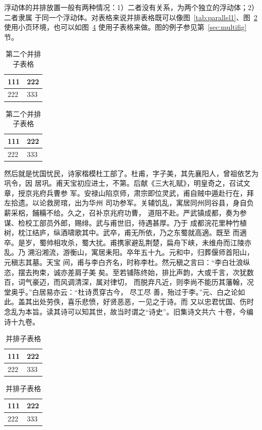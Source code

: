 浮动体的并排放置一般有两种情况：1）二者没有关系，为两个独立的浮动体；2）二者隶属
于同一个浮动体。对表格来说并排表格既可以像图~\ref{tab:parallel1}、图~\ref{tab:parallel2} 
使用小页环境，也可以如图~\ref{tab:subtable} 使用子表格来做。图的例子参见第~\ref{sec:multifig} 节。

\begin{table}[htbp]
\noindent\begin{minipage}{0.5\textwidth}
\centering
\caption{第一个并排子表格}
\label{tab:parallel1}
\begin{tabular}{p{2cm}p{2cm}}
\toprule[1.5pt]
111 & 222 \\\midrule[1pt]
222 & 333 \\\bottomrule[1.5pt]
\end{tabular}
\end{minipage}%
\begin{minipage}{0.5\textwidth}
\centering
\caption{第二个并排子表格}
\label{tab:parallel2}
\begin{tabular}{p{2cm}p{2cm}}
\toprule[1.5pt]
111 & 222 \\\midrule[1pt]
222 & 333 \\\bottomrule[1.5pt]
\end{tabular}
\end{minipage}
\end{table}

然后就是忧国忧民，诗家楷模杜工部了。杜甫，字子美，其先襄阳人，曾祖依艺为巩令，因
居巩。甫天宝初应进士，不第。后献《三大礼赋》，明皇奇之，召试文章，授京兆府兵曹参
军。安禄山陷京师，肃宗即位灵武，甫自贼中遁赴行在，拜左拾遗。以论救房琯，出为华州
司功参军。关辅饥乱，寓居同州同谷县，身自负薪采梠，餔糒不给。久之，召补京兆府功曹，
道阻不赴。严武镇成都，奏为参谋、检校工部员外郎，赐绯。武与甫世旧，待遇甚厚。乃于
成都浣花里种竹植树，枕江结庐，纵酒啸歌其中。武卒，甫无所依，乃之东蜀就高適。既至
而適卒。是岁，蜀帅相攻杀，蜀大扰。甫携家避乱荆楚，扁舟下峡，未维舟而江陵亦乱。乃
溯沿湘流，游衡山，寓居耒阳。卒年五十九。元和中，归葬偃师首阳山，元稹志其墓。天宝
间，甫与李白齐名，时称李杜。然元稹之言曰：“李白壮浪纵恣，摆去拘束，诚亦差肩子美
矣。至若铺陈终始，排比声韵，大或千言，次犹数百，词气豪迈，而风调清深，属对律切，
而脱弃凡近，则李尚不能历其藩翰，况堂奥乎。”白居易亦云：“杜诗贯穿古今，  尽工尽
善，殆过于李。”元、白之论如此。盖其出处劳佚，喜乐悲愤，好贤恶恶，一见之于诗。而
又以忠君忧国、伤时念乱为本旨。读其诗可以知其世，故当时谓之“诗史”。旧集诗文共六
十卷，今编诗十九卷。

\begin{table}[htbp]
\centering
\caption{并排子表格}
\label{tab:subtable}
{
\begin{tabular}{p{2cm}p{2cm}}
\toprule[1.5pt]
111 & 222 \\\midrule[1pt]
222 & 333 \\\bottomrule[1.5pt]
\end{tabular}
}
\hskip2cm
{
\begin{tabular}{p{2cm}p{2cm}}
\toprule[1.5pt]
111 & 222 \\\midrule[1pt]
222 & 333 \\\bottomrule[1.5pt]
\end{tabular}
}
\end{table}


